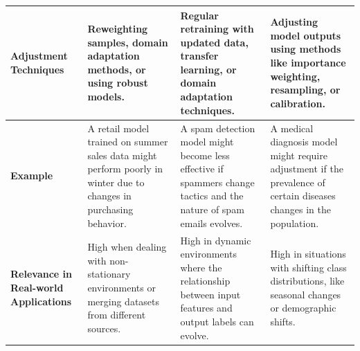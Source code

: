 \begin{longtable}{|m{3.5cm}|m{4cm}|m{4cm}|m{4cm}|}
    \textbf{Adjustment Techniques} & Reweighting samples, domain adaptation methods, or using robust models. & Regular retraining with updated data, transfer learning, or domain adaptation techniques. & Adjusting model outputs using methods like importance weighting, resampling, or calibration. \\ \hline

    \textbf{Example} & A retail model trained on summer sales data might perform poorly in winter due to changes in purchasing behavior. & A spam detection model might become less effective if spammers change tactics and the nature of spam emails evolves. & A medical diagnosis model might require adjustment if the prevalence of certain diseases changes in the population. \\ \hline

    \textbf{Relevance in Real-world Applications} & High when dealing with non-stationary environments or merging datasets from different sources. & High in dynamic environments where the relationship between input features and output labels can evolve. & High in situations with shifting class distributions, like seasonal changes or demographic shifts. \\ \hline

\end{longtable}


















